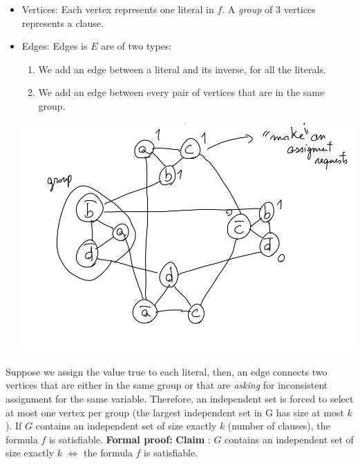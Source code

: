 \begin{itemize}
    \item Vertices: Each vertex represents one literal in $f$. A \textit{group} of 3 vertices represents a clause.
    \item Edges: Edges is $E$ are of two types:
    \begin{enumerate}
        \item We add an edge between a literal and its inverse, for all the literals.

        \item We add an edge between every pair of vertices that are in the same group.
    \end{enumerate}
    \begin{center}
        \includegraphics[scale=0.7]{images/Max Ind Set.png}
    \end{center}
\end{itemize}
Suppose we assign the value true to each literal, then, an edge connects two vertices that are either in the same group or that are \textit{asking} for inconsistent assignment for the same variable. Therefore, an independent set is forced to select at most one vertex per group (the largest independent set in G has size at most $k$). If $G$ contains an independent set of size exactly $k$ (number of clauses), the formula $f$ is satisfiable.\newline\newline
\textbf{Formal proof:}\newline
\textbf{Claim} : $G$ contains an independent set of size exactly $k$ $\iff$ the formula $f$ is satisfiable. \newline\newline
